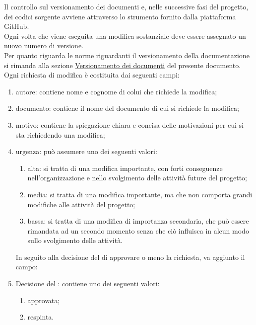 				Il controllo sul versionamento dei documenti e, nelle successive fasi del progetto, dei codici sorgente avviene attraverso lo strumento fornito dalla piattaforma GitHub.\\
				Ogni volta che viene eseguita una modifica sostanziale deve essere assegnato un nuovo numero di versione.\\
				Per quanto riguarda le norme riguardanti il versionamento della documentazione si rimanda alla sezione \hyperref[sec:versioni]{Versionamento dei documenti} del presente documento.
					Ogni richiesta di modifica è costituita dai seguenti campi:
					\begin{enumerate}
						\item autore: contiene nome e cognome di colui che richiede la modifica;
						\item documento: contiene il nome del documento di cui si richiede la modifica;
						\item motivo: contiene la spiegazione chiara e concisa delle motivazioni per cui si sta richiedendo una modifica;
						\item urgenza: può assumere uno dei seguenti valori:
							\begin{enumerate}
								\item alta: si tratta di una modifica importante, con forti conseguenze nell'organizzazione e nello svolgimento delle attività future del progetto;
								\item media: si tratta di una modifica importante, ma che non comporta grandi modifiche alle attività del progetto;
								\item bassa: si tratta di una modifica di importanza secondaria, che può essere rimandata ad un secondo momento senza che ciò influisca in alcun modo sullo svolgimento delle attività.
							\end{enumerate}
					In seguito alla decisione del  di approvare o meno la richiesta, va aggiunto il campo:
						\item Decisione del : contiene uno dei seguenti valori:
							\begin{enumerate}
								\item approvata;
								\item respinta.
							\end{enumerate}
					\end{enumerate}
		
